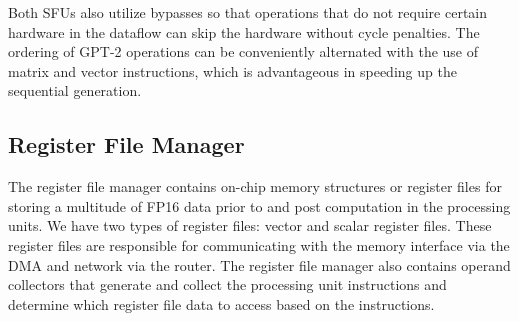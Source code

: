 Both SFUs also utilize bypasses so that operations that do not require certain hardware in the dataflow can skip the hardware without cycle penalties. %
The ordering of GPT-2 operations can be conveniently alternated with the use of matrix and vector instructions, which is advantageous in speeding up the sequential generation.




\subsection{Register File Manager} \label{microarchitecture_registerfile}
The register file manager contains on-chip memory structures or register files for storing a multitude of FP16 data prior to and post computation in the processing units. We have two types of register files: vector and scalar register files. These register files are responsible for communicating with the memory interface via the DMA and network via the router.
The register file manager also contains operand collectors that generate and collect the processing unit instructions and determine which register file data to access based on the instructions. 


